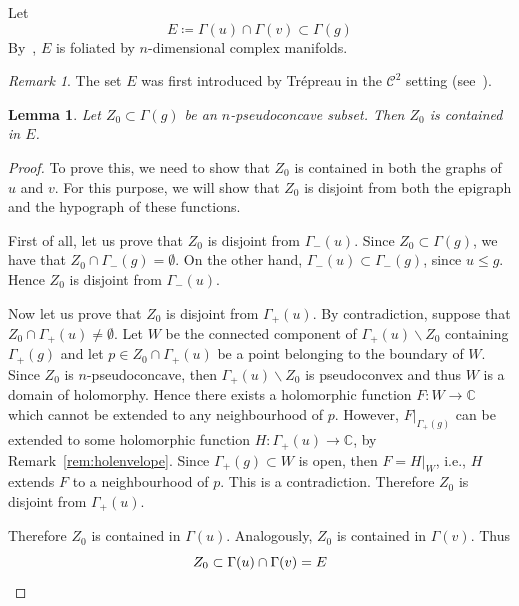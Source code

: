 \documentclass[reqno,oneside]{amsart}
\newcommand{\numberset}{\mathbb}
\newcommand{\C}{\numberset{C}}
\theoremstyle{definition}
\theoremstyle{plain}
\newtheorem{lemma}[definition]{Lemma}
\theoremstyle{remark}
\newtheorem{remark}[definition]{Remark}
\begin{document}
Let
\[
	E\coloneqq\Gamma(u)\cap\Gamma(v)\subset\Gamma(g)
\]
By~\cite[Corollary to Theorem~2]{chirka:trepreau_theorem}, $E$ is foliated by $n$-dimensional complex manifolds.
\begin{remark}
	The set $E$ was first introduced by Trépreau in the $\mathscr{C}^2$ setting (see~\cite[Theorem~1.1]{trepreau:prolongement}).
\end{remark}

\begin{lemma}
\label{lemma:contained}
	Let $Z_0\subset\Gamma(g)$ be an $n$-pseudoconcave subset. Then $Z_0$ is contained in $E$. 
\end{lemma}
\begin{proof}
	To prove this, we need to show that $Z_0$ is contained in both the graphs of $u$ and $v$. For this purpose, we will show that $Z_0$ is disjoint from both the epigraph and the hypograph of these functions.
	
	First of all, let us prove that $Z_0$ is disjoint from $\Gamma_-(u)$. Since $Z_0\subset\Gamma(g)$, we have that $Z_0\cap\Gamma_-(g)=\emptyset$. On the other hand, $\Gamma_-(u)\subset\Gamma_-(g)$, since $u\leq g$. Hence $Z_0$ is disjoint from $\Gamma_-(u)$.
	
	Now let us prove that $Z_0$ is disjoint from $\Gamma_+(u)$. By contradiction, suppose that $Z_0\cap\Gamma_+(u)\neq\emptyset$. Let $W$ be the connected component of $\Gamma_+(u)\smallsetminus Z_0$ containing $\Gamma_+(g)$ and let $p\in Z_0\cap\Gamma_+(u)$ be a point belonging to the boundary of $W$. Since $Z_0$ is $n$-pseudoconcave, then $\Gamma_+(u)\smallsetminus Z_0$ is pseudoconvex and thus $W$ is a domain of holomorphy. Hence there exists a holomorphic function $F:W\to\C$ which cannot be extended to any neighbourhood of $p$. However, $F|_{\Gamma_+(g)}$ can be extended to some holomorphic function $H:\Gamma_+(u)\to\C$, by Remark~\ref{rem:holenvelope}. Since $\Gamma_+(g)\subset W$ is open, then $F=H|_W$, i.e., $H$ extends $F$ to a neighbourhood of $p$. This is a contradiction. Therefore $Z_0$ is disjoint from $\Gamma_+(u)$.
	
	Therefore $Z_0$ is contained in $\Gamma(u)$. Analogously, $Z_0$ is contained in $\Gamma(v)$. Thus
	\[
		Z_0\subset\Gamma(u)\cap\Gamma(v)=E \qedhere
	\]
\end{proof}
\end{document}
